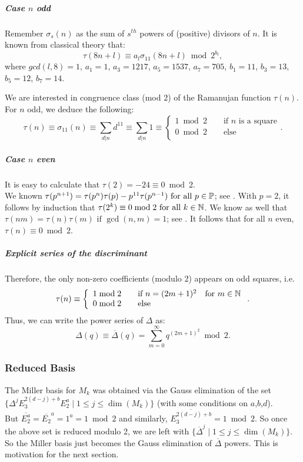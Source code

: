 \subparagraph{Case $n$ odd}
Remember $\sigma_s(n)$ as the sum of $s^{th}$ powers of (positive) divisors of $n$.
It is known from classical theory \cite[p.8]{kolberg} that:
$$\tau(8n+l) \equiv a_l \sigma_{11}(8n+l) \bmod {2^{b_l}}, $$
where $gcd(l,8)=1$, $a_1 = 1$, $a_3 = 1217$, $a_5 = 1537$, $a_7 = 705$, 
$b_1 = 11$, $b_3 = 13$, $b_5 = 12$, $b_7 = 14$.

We are interested in congruence class (mod $2$) of the Ramanujan function $\tau(n)$.
For $n$ odd, we deduce the following:
$$\tau(n) \equiv \sigma_{11}(n) \equiv \sum_{d | n} d^{11}
\equiv \sum_{d | n} 1 \equiv \left\lbrace
\begin{array}{ll}
1 \bmod 2 \qquad \text{if } n \text{ is a square}\\
0 \bmod 2 \qquad \text{else}\\
\end{array} \right..
$$
\subparagraph{Case $n$ even}
It is easy to calculate that $\tau(2) = -24 \equiv 0 \bmod 2$.\\
We known $\tau(p^{n+1}) = \tau(p^n)\tau(p) - p^{11}\tau(p^{n-1}) \text{ for all } p \in \mathbb{P}$; see \cite[p.97]{CourseInArithmetic}. With $p=2$, it follows by induction that $\tau(2^k) \equiv 0 \bmod 2 \text{ for all } k \in \mathbb{N}$.
We know as well that $\tau(nm) = \tau(n)\tau(m) \text{ if } \gcd(n,m)=1$; see \cite[p.97]{CourseInArithmetic}. It follows that for all $n$ even, $\tau(n) \equiv 0 \bmod 2$.
\subparagraph[Summary]{Explicit series of the discriminant}
\label{DeltaSeries}
Therefore, the only non-zero coefficients (modulo $2$) appears on odd squares, i.e.
$$
\tau(n) \equiv \left\lbrace \begin{array}{ll}
1 \bmod 2 \qquad \text{if } n=(2m+1)^2 \quad \text{for } m \in \mathbb{N}\\
0 \bmod 2 \qquad \text{else} 
\end{array}\right..
$$
Thus, we can write the power series of $\Delta$ as:
\[
\Delta(q) \equiv \overline{\Delta}(q) = \sum_{m=0}^{\infty} q^{(2m+1)^2} \bmod 2.
\label{eq:Delta}
\]

\subsubsection{Reduced Basis}
The Miller basis for $M_k$ was obtained via the Gauss elimination of the set $\{ \Delta^jE_3^{2(d-j)+b}E_2^a \mid 1 \leq j \leq \dim(M_k) \}$ (with some conditions on $a$,$b$,$d$).\\
But $\overline{E_2^a} = \overline{E_2}^a = 1^a = 1 \bmod 2$ and similarly, $\overline{E_3^{2(d-j)+b}} = 1 \bmod 2$.
So once the above set is reduced modulo 2, we are left with $\{ \overline{\Delta}^j \mid 1 \leq j \leq \dim(M_k) \}$.
So the Miller basis just becomes the Gauss elimination of $\overline{\Delta}$ powers.
This is motivation for the next section.



